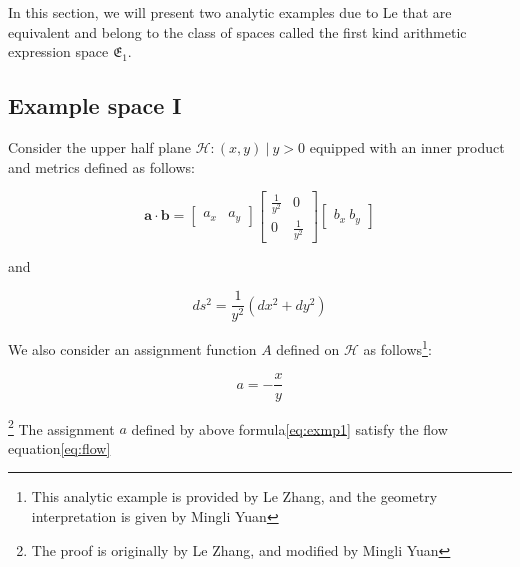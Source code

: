 \usepackage{amsmath}
In this section, we will present two analytic examples due to Le that are equivalent and belong to the class of spaces
called the first kind arithmetic expression space $\mathfrak{E}_1$.

\subsection{Example space I}\label{subsec:exmp1}

Consider the upper half plane ${\mathcal{H}: (x, y) \ | \ y > 0}$ equipped with an inner product and metrics defined as follows:

$$
\mathbf{a} \cdot \mathbf{b} = \begin{bmatrix} a_x & a_y \end{bmatrix} \begin{bmatrix} \frac{1}{y^2} & 0 \\ 0 & \frac{1}{y^2} \end{bmatrix} \begin{bmatrix} b_x \ b_y \end{bmatrix}
$$

and

$$
ds^2 = \frac{1}{y^2} (dx^2 + dy^2)
$$

We also consider an assignment function $A$ defined on $\mathcal{H}$ as follows\footnote{This analytic example is provided by Le Zhang, and the geometry interpretation is given by Mingli Yuan}:

\begin{equation}\label{eq:exmp1}
a = - \frac{x}{y}
\end{equation}

\begin{theorem}\footnote{The proof is originally by Le Zhang, and modified by Mingli Yuan}
The assignment $a$ defined by above formula\eqref{eq:exmp1} satisfy the flow equation\eqref{eq:flow}
\end{theorem}

